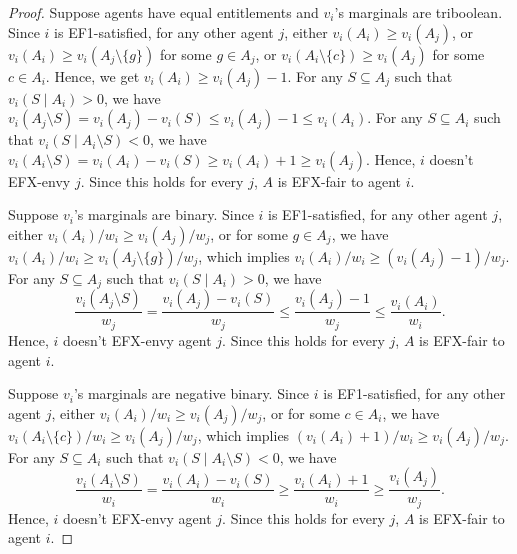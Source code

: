 \begin{proof}
Suppose agents have equal entitlements and $v_i$'s marginals are triboolean.
Since $i$ is EF1-satisfied, for any other agent $j$, either $v_i(A_i) \ge v_i(A_j)$,
or $v_i(A_i) \ge v_i(A_j \setminus \{g\})$ for some $g \in A_j$,
or $v_i(A_i \setminus \{c\}) \ge v_i(A_j)$ for some $c \in A_i$.
Hence, we get $v_i(A_i) \ge v_i(A_j) - 1$.
For any $S \subseteq A_j$ such that $v_i(S \mid A_i) > 0$,
we have $v_i(A_j \setminus S) = v_i(A_j) - v_i(S) \le v_i(A_j) - 1 \le v_i(A_i)$.
For any $S \subseteq A_i$ such that $v_i(S \mid A_i \setminus S) < 0$,
we have $v_i(A_i \setminus S) = v_i(A_i) - v_i(S) \ge v_i(A_i) + 1 \ge v_i(A_j)$.
Hence, $i$ doesn't EFX-envy $j$.
Since this holds for every $j$, $A$ is EFX-fair to agent $i$.

Suppose $v_i$'s marginals are binary.
Since $i$ is EF1-satisfied, for any other agent $j$, either $v_i(A_i)/w_i \ge v_i(A_j)/w_j$,
or for some $g \in A_j$, we have $v_i(A_i)/w_i \ge v_i(A_j \setminus \{g\})/w_j$,
which implies $v_i(A_i)/w_i \ge (v_i(A_j) - 1)/w_j$.
For any $S \subseteq A_j$ such that $v_i(S \mid A_i) > 0$, we have
\[ \frac{v_i(A_j \setminus S)}{w_j} = \frac{v_i(A_j) - v_i(S)}{w_j}
\le \frac{v_i(A_j) - 1}{w_j} \le \frac{v_i(A_i)}{w_i}. \]
Hence, $i$ doesn't EFX-envy agent $j$.
Since this holds for every $j$, $A$ is EFX-fair to agent $i$.

Suppose $v_i$'s marginals are negative binary.
Since $i$ is EF1-satisfied, for any other agent $j$, either $v_i(A_i)/w_i \ge v_i(A_j)/w_j$,
or for some $c \in A_i$, we have $v_i(A_i \setminus \{c\})/w_i \ge v_i(A_j)/w_j$,
which implies $(v_i(A_i) + 1)/w_i \ge v_i(A_j)/w_j$.
For any $S \subseteq A_i$ such that $v_i(S \mid A_i \setminus S) < 0$, we have
\[ \frac{v_i(A_i \setminus S)}{w_i} = \frac{v_i(A_i) - v_i(S)}{w_i}
\ge \frac{v_i(A_i) + 1}{w_i} \ge \frac{v_i(A_j)}{w_j}. \]
Hence, $i$ doesn't EFX-envy agent $j$.
Since this holds for every $j$, $A$ is EFX-fair to agent $i$.
\end{proof}

